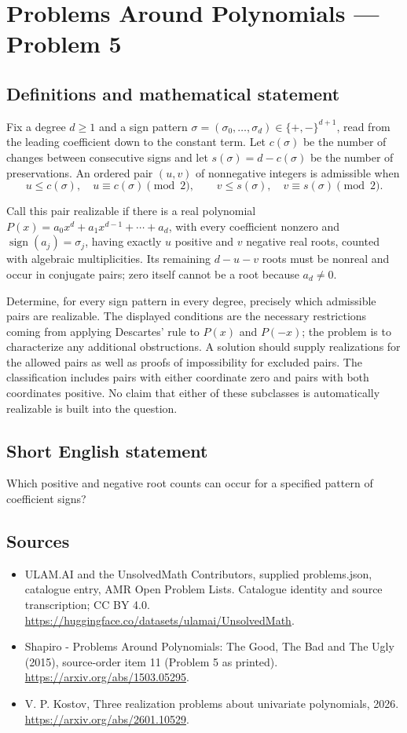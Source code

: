 \documentclass[11pt,a4paper]{article}
\begin{document}
\section*{Problems Around Polynomials — Problem 5}\label{statement}

\subsection{Definitions and mathematical statement}
Fix a degree $d\geq1$ and a sign pattern
$\sigma=(\sigma_0,\ldots,\sigma_d)\in\{+,-\}^{d+1}$, read from the
leading coefficient down to the constant term. Let $c(\sigma)$ be
the number of changes between consecutive signs and let
$s(\sigma)=d-c(\sigma)$ be the number of preservations.
An ordered pair $(u,v)$ of nonnegative integers is admissible when
\[
 u\leq c(\sigma),\quad u\equiv c(\sigma)\pmod2,\qquad
 v\leq s(\sigma),\quad v\equiv s(\sigma)\pmod2.
\]

Call this pair realizable if there is a real polynomial
$P(x)=a_0x^d+a_1x^{d-1}+\cdots+a_d$, with every coefficient nonzero
and $\operatorname{sign}(a_j)=\sigma_j$, having exactly $u$ positive
and $v$ negative real roots, counted with algebraic multiplicities.
Its remaining $d-u-v$ roots must be nonreal and occur in conjugate
pairs; zero itself cannot be a root because $a_d\ne0$.

Determine, for every sign pattern in every degree, precisely which
admissible pairs are realizable. The displayed conditions are the
necessary restrictions coming from applying Descartes' rule to
$P(x)$ and $P(-x)$; the problem is to characterize any additional
obstructions. A solution should supply realizations for the allowed
pairs as well as proofs of impossibility for excluded pairs.
The classification includes pairs with either coordinate zero and
pairs with both coordinates positive. No claim that either of
these subclasses is automatically realizable is built into the question.
\subsection{Short English statement}
Which positive and negative root counts can occur for a specified pattern of coefficient signs?
\subsection{Sources}
\begin{itemize}
\item[S1] ULAM.AI and the UnsolvedMath Contributors, supplied problems.json, catalogue entry, AMR Open Problem Lists. Catalogue identity and source transcription; CC BY 4.0.
\url{https://huggingface.co/datasets/ulamai/UnsolvedMath}.
\item[S2] Shapiro - Problems Around Polynomials: The Good, The Bad and The Ugly (2015), source-order item 11 (Problem 5 as printed). 
\url{https://arxiv.org/abs/1503.05295}.
\item[S3] V. P. Kostov, Three realization problems about univariate polynomials, 2026.
\url{https://arxiv.org/abs/2601.10529}.
\end{itemize}
\end{document}
